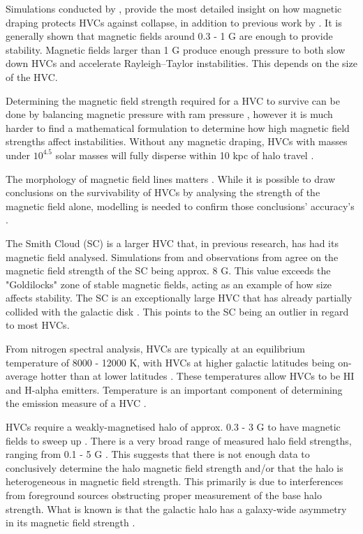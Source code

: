 Simulations conducted by \citep{ID23, ID24, ID33}, provide the most detailed insight on how magnetic draping protects HVCs against collapse, in addition to previous work by \citep{ID11, ID13, ID25}. It is generally shown that magnetic fields around 0.3 - 1 {\textmu}G are enough to provide stability. Magnetic fields larger than 1 {\textmu}G produce enough pressure to both slow down HVCs and accelerate Rayleigh–Taylor instabilities. This depends on the size of the HVC.

Determining the magnetic field strength required for a HVC to survive can be done by balancing magnetic pressure with ram pressure \cite{ID13}, however it is much harder to find a mathematical formulation to determine how high magnetic field strengths affect instabilities. Without any magnetic draping, HVCs with masses under $10^4.5$ solar masses will fully disperse within 10 kpc of halo travel \cite{ID25}.

The morphology of magnetic field lines matters \cite{ID24}. While it is possible to draw conclusions on the survivability of HVCs by analysing the strength of the magnetic field alone, modelling is needed to confirm those conclusions' accuracy's \cite{ID5}.

The Smith Cloud (SC) is a larger HVC that, in previous research, has had its magnetic field analysed. Simulations from \citep{ID23} and observations from \citep{ID28} agree on the magnetic field strength of the SC being approx. 8 {\textmu}G. This value exceeds the "Goldilocks" zone of stable magnetic fields, acting as an example of how size affects stability. The SC is an exceptionally large HVC that has already partially collided with the galactic disk \cite{ID28, ID35}. This points to the SC being an outlier in regard to most HVCs.

From nitrogen spectral analysis, HVCs are typically at an equilibrium temperature of 8000 - 12000 K, with HVCs at higher galactic latitudes being on-average hotter than at lower latitudes \cite{ID48, ID49}. These temperatures allow HVCs to be HI and H-alpha emitters. Temperature is an important component of determining the emission measure of a HVC \cite{ID5, ID26, ID30}.

HVCs require a weakly-magnetised halo of approx. 0.3 - 3 {\textmu}G to have magnetic fields to sweep up \cite{ID13}. There is a very broad range of measured halo field strengths, ranging from 0.1 - 5 {\textmu}G \cite{ID4, ID16, ID21, ID30, ID37, ID42}. This suggests that there is not enough data to conclusively determine the halo magnetic field strength and/or that the halo is heterogeneous in magnetic field strength. This primarily is due to interferences from foreground sources obstructing proper measurement of the base halo strength. What is known is that the galactic halo has a galaxy-wide asymmetry in its magnetic field strength \cite{ID16, ID30, ID21}.

